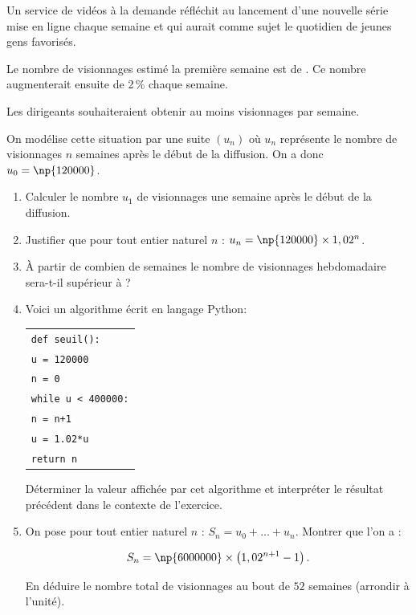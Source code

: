 \medskip

Un service de vidéos à la demande réfléchit au lancement d'une nouvelle série mise en ligne chaque semaine et qui aurait comme sujet le quotidien de jeunes gens favorisés.

Le nombre de visionnages estimé la première semaine est de . Ce nombre augmenterait ensuite de 2\,\% chaque semaine.

Les dirigeants souhaiteraient obtenir au moins  visionnages par semaine.

On modélise cette situation par une suite $\left(u_n\right)$ où $u_n$ représente le nombre de visionnages $n$ semaines après le début de la diffusion. On a donc $u_0 = \np{120000}$.

\medskip

\begin{enumerate}
\item Calculer le nombre $u_1$ de visionnages une semaine après le début de la diffusion. 
\item Justifier que pour tout entier naturel $n$ : $u_n = \np{120000} \times  1,02^n$.
\item À partir de combien de semaines le nombre de visionnages hebdomadaire sera-t-il supérieur à  ?
\item Voici un algorithme écrit en langage Python:

\begin{center}
\begin{tabularx}{0.55\linewidth}{X}
\texttt{def seuil():}\\
\quad \texttt{u = 120000}\\
\quad \texttt{n = 0}\\
\quad \texttt{while u < 400000:}\\
\qquad \texttt{n = n+1}\\
\qquad \texttt{u = 1.02*u}\\
\quad \texttt{return n}\\
\end{tabularx}
\end{center}

Déterminer la valeur affichée par cet algorithme et interpréter le résultat précédent
dans le contexte de l'exercice. 

\item On pose pour tout entier naturel $n$ : $S_n = u_0 + \ldots + u_n$. Montrer que l'on a :

\[S_n = \np{6000000} \times \left(1,02^{n+1} - 1\right).\]

En déduire le nombre total de visionnages au bout de $52$ semaines (arrondir à
l'unité).

\end{enumerate}
